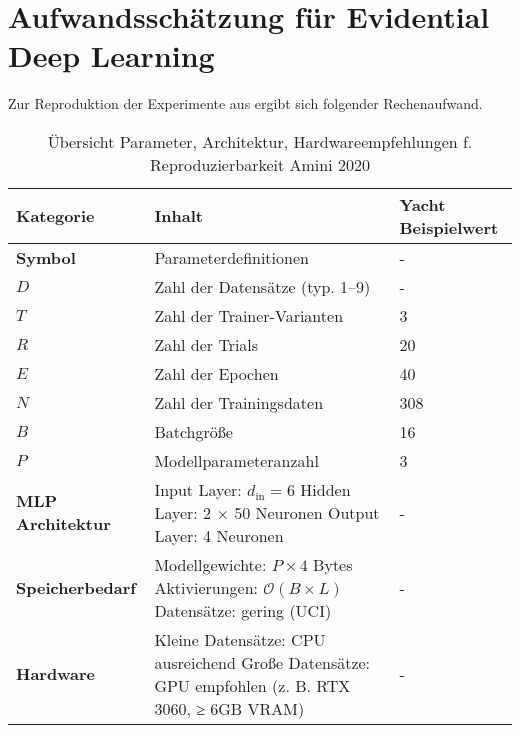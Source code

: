 \pagebreak

\section*{Aufwandsschätzung für Evidential Deep Learning}
\label{sec:aufwand-edl-amini}

Zur Reproduktion der Experimente aus \parencite{amini2020deep} ergibt sich folgender Rechenaufwand.

\begin{table}[!htbp]
  \centering
  \footnotesize
  \begin{tabularx}{\textwidth}{|l|X|X|}
    \hline
    \textbf{Kategorie} & \textbf{Inhalt} & \textbf{Yacht Beispielwert} \\
    \hline
    \textbf{Symbol} & Parameterdefinitionen & - \\
    \hline
    $D$ & Zahl der Datensätze (typ. 1–9) & - \\
    \hline
    $T$ & Zahl der Trainer-Varianten & 3 \\
    \hline
    $R$ & Zahl der Trials & 20 \\
    \hline
    $E$ & Zahl der Epochen & 40 \\
    \hline
    $N$ & Zahl der Trainingsdaten & 308 \\
    \hline
    $B$ & Batchgröße & 16 \\
    \hline
    $P$ & Modellparameteranzahl & 3 \\
    \hline
    \textbf{MLP Architektur} & Input Layer: $d_\text{in}=6$ \newline Hidden Layer: 2 × 50 Neuronen \newline Output Layer: 4 Neuronen & - \\
    \hline
    \textbf{Speicherbedarf} & Modellgewichte: $P \times 4$ Bytes \newline Aktivierungen: $\mathcal{O}(B \times L)$ \newline Datensätze: gering (UCI) & - \\
    \hline
    \textbf{Hardware} & Kleine Datensätze: CPU ausreichend \newline Große Datensätze: GPU empfohlen (z. B. RTX 3060, ≥ 6GB VRAM) & - \\
    \hline
  \end{tabularx}
  \caption{\footnotesize Übersicht Parameter, Architektur, Hardwareempfehlungen f. Reproduzierbarkeit Amini 2020}
  \label{tab:edl-gesamt}
\end{table}


\vspace{-0.5em}

